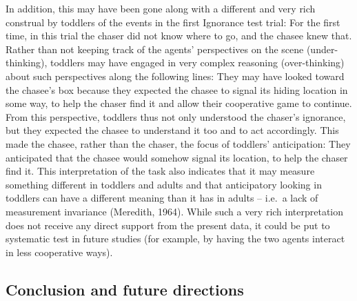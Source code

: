 \documentclass[
  man,floatsintext]{apa6}
\begin{document}
In addition, this may have been gone along with a different and very rich construal by toddlers of the events in the first Ignorance test trial: For the first time, in this trial the chaser did not know where to go, and the chasee knew that. Rather than not keeping track of the agents' perspectives on the scene (under-thinking), toddlers may have engaged in very complex reasoning (over-thinking) about such perspectives along the following lines: They may have looked toward the chasee's box because they expected the chasee to signal its hiding location in some way, to help the chaser find it and allow their cooperative game to continue. From this perspective, toddlers thus not only understood the chaser's ignorance, but they expected the chasee to understand it too and to act accordingly. This made the chasee, rather than the chaser, the focus of toddlers' anticipation: They anticipated that the chasee would somehow signal its location, to help the chaser find it. This interpretation of the task also indicates that it may measure something different in toddlers and adults and that anticipatory looking in toddlers can have a different meaning than it has in adults -- i.e.~a lack of measurement invariance (Meredith, 1964). While such a very rich interpretation does not receive any direct support from the present data, it could be put to systematic test in future studies (for example, by having the two agents interact in less cooperative ways).

\subsection{Conclusion and future directions}\label{conclusion-and-future-directions}
\end{document}

